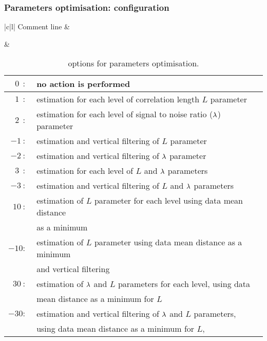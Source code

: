 \begin{frame}
\frametitle{Parameters optimisation:  configuration}

\begin{table}
\centering
\caption{ options for parameters optimisation.}
\tiny{
\begin{tabular}{|c|l|}
\hline  
{ { Comment line}}
 & 
\\ \hline  \hline  
 
&
\begin{tabular}{r|l}
{\sf $0\ \ :\ $} & {\sf  no action is performed} \\ \hline
{\sf $1\ \ :\ $} & {\sf  estimation for each level of correlation length $L$ parameter} \\ \hline
{\sf $2\ \ :\ $} & {\sf  estimation for each level of signal to noise ratio ($\lambda$) parameter} \\ \hline
{\sf $-1\ :\ $} & {\sf  estimation and vertical filtering of $L$ parameter} \\ \hline
{\sf $-2\ :\ $} & {\sf  estimation and vertical filtering of $\lambda$ parameter } \\ \hline
{\sf $3\ \ :\ $} & {\sf  estimation for each level of $L$ and $\lambda$ parameters} \\ \hline
{\sf $-3\ :\ $} & {\sf  estimation and vertical filtering of $L$ and $\lambda$ parameters} \\ \hline
{\sf $10\ :\ $} & {\sf  estimation of $L$ parameter for each level using data mean distance} \\
& {\sf as a minimum} \\ \hline
{\sf $-10:\ $} & {\sf  estimation of $L$ parameter using data mean distance as a minimum} \\
& {\sf and vertical filtering} \\ \hline
{\sf $30\ :\ $} & {\sf  estimation of $\lambda$ and $L$ parameters for each level, using data} \\
& {\sf mean distance as a minimum for $L$} \\ \hline
{\sf $-30:\ $} & {\sf  estimation and vertical filtering of $\lambda$ and $L$ parameters,} \\
& {\sf  using data mean distance as a minimum for $L$,} 
\end{tabular} 
\\ \hline 
\end{tabular}
}
\end{table}

\end{frame}


